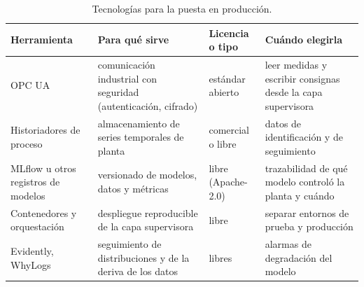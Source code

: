 \begin{table}[htbp]
\centering\footnotesize
\begin{tabularx}{\textwidth}{@{}>{\raggedright\arraybackslash}p{3.1cm}>{\raggedright\arraybackslash}X>{\raggedright\arraybackslash}p{2.0cm}>{\raggedright\arraybackslash}X@{}}
\toprule
Herramienta & Para qué sirve & Licencia o tipo & Cuándo elegirla \\
\midrule
OPC UA & comunicación industrial con seguridad (autenticación, cifrado) & estándar abierto & leer medidas y escribir consignas desde la capa supervisora \\
Historiadores de proceso & almacenamiento de series temporales de planta & comercial o libre & datos de identificación y de seguimiento \\
MLflow u otros registros de modelos & versionado de modelos, datos y métricas & libre (Apache-2.0) & trazabilidad de qué modelo controló la planta y cuándo \\
Contenedores y orquestación & despliegue reproducible de la capa supervisora & libre & separar entornos de prueba y producción \\
Evidently, WhyLogs & seguimiento de distribuciones y de la deriva de los datos & libres & alarmas de degradación del modelo \\
\bottomrule
\end{tabularx}
\caption{Tecnologías para la puesta en producción.}
\label{tab:tec6}
\end{table}

\addtocounter{definicion}{1}%

